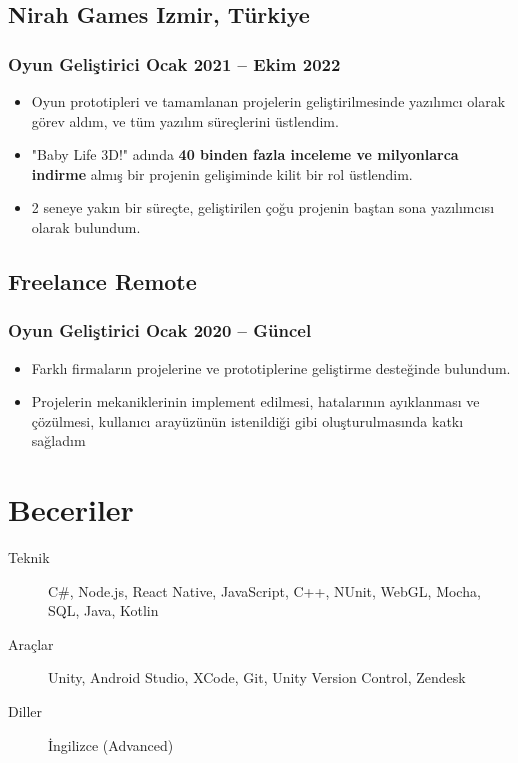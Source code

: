 \documentclass[11pt]{article}
\newcommand{\rside}[1]{
  \hfill {\normalfont\color{accent} #1}%
}
\begin{document}
\subsection{Nirah Games  \rside{Izmir, Türkiye}}
\subsubsection{Oyun Geliştirici \rside{Ocak 2021 -- Ekim 2022}}
\begin{itemize}
  \item Oyun prototipleri ve tamamlanan projelerin geliştirilmesinde yazılımcı olarak görev aldım, ve tüm yazılım süreçlerini üstlendim.
  \item "Baby Life 3D!" adında \textbf{40 binden fazla inceleme ve milyonlarca indirme} almış bir projenin gelişiminde kilit bir rol üstlendim.
  \item 2 seneye yakın bir süreçte, geliştirilen çoğu projenin baştan sona yazılımcısı olarak bulundum.
\end{itemize}

\subsection{Freelance \rside{Remote}}
\subsubsection{Oyun Geliştirici \rside{Ocak 2020 -- Güncel}}
\begin{itemize}
  \item Farklı firmaların projelerine ve prototiplerine geliştirme desteğinde bulundum.
  \item Projelerin mekaniklerinin implement edilmesi, hatalarının ayıklanması ve çözülmesi, kullanıcı arayüzünün istenildiği gibi oluşturulmasında katkı sağladım
\end{itemize}
\section{Beceriler}
\begin{description}
   \item[Teknik] C\#, Node.js, React Native, JavaScript, C++, NUnit, WebGL, Mocha, SQL, Java, Kotlin
  \item[Araçlar] Unity, Android Studio, XCode, Git, Unity Version Control, Zendesk
  \item[Diller] İngilizce (Advanced)
\end{description}
\end{document}

